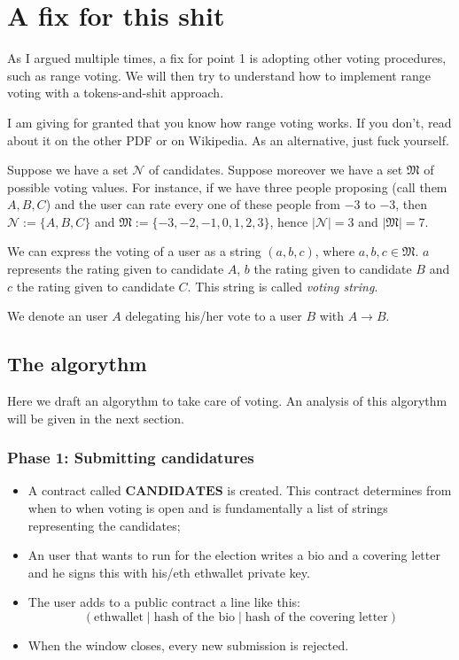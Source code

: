 \documentclass[submission, copyright,creativecommons,sharealike,noncommercial]{eptcs}
\begin{document}
\section{A fix for this shit}
	As I argued multiple times, a fix for point 1 is adopting other voting procedures, such as range voting. We will then try to understand how to implement range voting with a tokens-and-shit approach.
	
	I am giving for granted that you know how range voting works. If you don't, read about it on the other PDF or on Wikipedia. As an alternative, just fuck yourself.
	
	\begin{definition}\label{voting string}
		Suppose we have a set $\mathcal{N}$ of candidates. Suppose moreover we have a set $\mathfrak{M}$ of possible voting values. For instance, if we have three people proposing (call them $A, B, C$) and the user can rate every one of these people from $-3$ to $-3$, then $\mathcal{N} := \{A, B, C\}$ and $\mathfrak{M} := \{-3,-2,-1,0,1,2,3\}$, hence $|\mathcal{N}| = 3$ and $|\mathfrak{M}|=7$.
		
		We can express the voting of a user as a string $(a,b,c)$, where $a,b,c \in \mathfrak{M}$. $a$ represents the rating given to candidate $A$, $b$ the rating given to candidate $B$ and $c$ the rating given to candidate $C$. This string is called \emph{voting string}.
	\end{definition}
	\begin{definition}
 		We denote an user $A$ delegating his/her vote to a user $B$ with $A \to B$.
	\end{definition}
	
	\subsection{The algorythm}
		Here we draft an algorythm to take care of voting. An analysis of this algorythm will be given in the next section.
		\subsubsection{Phase 1: Submitting candidatures}
		
		\begin{itemize}
			\item A contract called $\textbf{CANDIDATES}$ is created. This contract determines from when to when voting is open and is fundamentally a list of strings representing the candidates;
			
			\item An user that wants to run for the election writes a bio and a covering letter and he signs this with his/eth ethwallet private key.
			
			\item The user adds to a public contract a line like this:
			\[
			(\text{ethwallet} \mid \text{hash of the bio} \mid \text{hash of the covering letter})
			\]
			
			\item When the window closes, every new submission is rejected. 
		\end{itemize}
\end{document}
